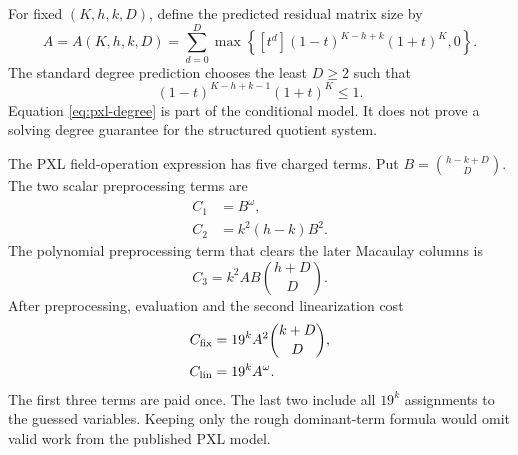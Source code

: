 For fixed $(K,h,k,D)$, define the predicted residual matrix size by
\begin{equation}
 A=A(K,h,k,D)
 =\sum_{d=0}^{D}
   \max\left\{
     [t^d](1-t)^{K-h+k}(1+t)^K,
     0
   \right\}.
 \label{eq:pxl-A}
\end{equation}
The standard degree prediction chooses the least $D\ge2$ such that
\begin{equation}
 [t^D](1-t)^{K-h+k-1}(1+t)^K\le1.
 \label{eq:pxl-degree}
\end{equation}
Equation \eqref{eq:pxl-degree} is part of the conditional model.  It does not
prove a solving degree guarantee for the structured quotient system.

The PXL field-operation expression has five charged terms.  Put
$B=\binom{h-k+D}{D}$.  The two scalar preprocessing terms are
\begin{align}
 C_1
 &=B^\omega,                                           \label{eq:pxl-C1}\\
 C_2
 &=k^2(h-k)B^2.                                        \label{eq:pxl-C2}
\end{align}
The polynomial preprocessing term that clears the later Macaulay columns is
\begin{equation}
 C_3
 =k^2AB\binom{h+D}{D}.                                 \label{eq:pxl-C3}
\end{equation}
After preprocessing, evaluation and the second linearization cost
\begin{align}
 C_{\rm fix}
 &=19^kA^2\binom{k+D}{D},                             \label{eq:pxl-Cfix}\\
 C_{\rm lin}
 &=19^kA^\omega.                                      \label{eq:pxl-Clin}
\end{align}
The first three terms are paid once.  The last two include all $19^k$
assignments to the guessed variables.  Keeping only the rough dominant-term
formula would omit valid work from the published PXL model.

